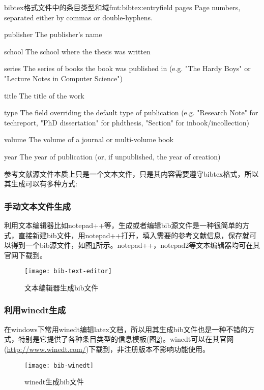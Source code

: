 \documentclass[twoside]{article} %
\begin{document}
\begin{codetex}{bibtex格式文件中的条目类型和域}{fmt:bibtex:entryfield}
pages
Page numbers, separated either by commas or double-hyphens.

publisher
The publisher's name

school
The school where the thesis was written

series
The series of books the book was published in (e.g. "The Hardy Boys" or "Lecture Notes in Computer Science")

title
The title of the work

type
The field overriding the default type of publication (e.g. "Research Note" for techreport, "{PhD} dissertation" for phdthesis, "Section" for inbook/incollection)

volume
The volume of a journal or multi-volume book

year
The year of publication (or, if unpublished, the year of creation)
\end{codetex}

参考文献源文件本质上只是一个文本文件，只是其内容需要遵守bibtex格式，所以其生成可以有多种方式:

\subsubsection{手动文本文件生成}

利用文本编辑器比如notepad++等，生成或者编辑bib源文件是一种很简单的方式，直接新建bib文件，用notepad++打开，填入需要的参考文献信息，保存就可以得到一个bib源文件，如图\ref{bib:texteditor}所示。notepad++，notepad2等文本编辑器均可在其官网下载到。

\begin{figure}[!htb]
  \centering
  \texttt{[image: bib-text-editor]}
  \caption{文本编辑器生成bib文件}\label{bib:texteditor}
\end{figure}

\subsubsection{利用winedt生成}
在windows下常用winedt编辑latex文档，所以用其生成bib文件也是一种不错的方式，特别是它提供了各种条目类型的信息模板(图\ref{bib:winedt})。winedt可以在其官网(\url{http://www.winedt.com/})下载到，非注册版本不影响功能使用。

\begin{figure}[!htb]
  \centering
  \texttt{[image: bib-winedt]}
  \caption{winedt生成bib文件}\label{bib:winedt}
\end{figure}
\end{document}
